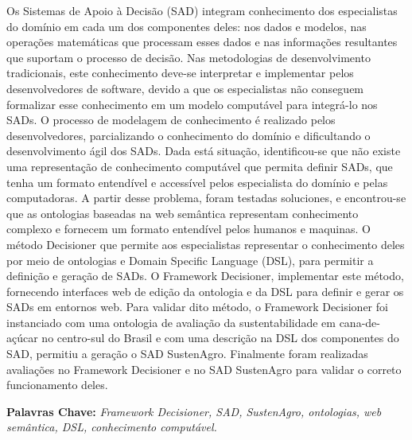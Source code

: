 Os Sistemas de Apoio à Decisão (SAD)
integram conhecimento dos especialistas do domínio em cada um dos
componentes deles: nos dados e modelos, nas operações matemáticas
que processam esses dados e nas informações resultantes que suportam
o processo de decisão. Nas metodologias de desenvolvimento tradicionais,
este conhecimento deve-se interpretar e implementar pelos desenvolvedores
de software, devido a que os especialistas não conseguem formalizar
esse conhecimento em um modelo computável para integrá-lo nos SADs.
O processo de modelagem de conhecimento é realizado pelos desenvolvedores,
parcializando o conhecimento do domínio e dificultando o desenvolvimento
ágil dos SADs. Dada está situação, identificou-se que não existe uma
representação de conhecimento computável que permita definir SADs,
que tenha um formato entendível e accessível pelos especialista do
domínio e pelas computadoras. A partir desse problema, foram testadas
soluciones, e encontrou-se que as ontologias baseadas na web semântica
representam conhecimento complexo e fornecem um formato entendível
pelos humanos e maquinas. O método Decisioner que permite aos especialistas
representar o conhecimento deles por meio de ontologias e \foreignlanguage{english}{Domain
Specific Language} (DSL),
para permitir a definição e geração de SADs. O \foreignlanguage{english}{Framework}
Decisioner, implementar este método, fornecendo interfaces web de
edição da ontologia e da DSL para definir e gerar os SADs em entornos
web. Para validar dito método, o Framework Decisioner foi instanciado
com uma ontologia de avaliação da sustentabilidade em cana-de-açúcar
no centro-sul do Brasil e com uma descrição na DSL dos componentes
do SAD, permitiu a geração o SAD SustenAgro. Finalmente foram realizadas
avaliações no Framework Decisioner e no SAD SustenAgro para validar
o correto funcionamento deles.

\textbf{Palavras Chave:} \emph{Framework Decisioner, SAD, SustenAgro,
ontologias, web semântica, DSL, conhecimento computável.}
